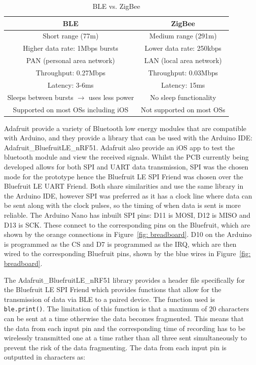 \begin{table}[t!]
\centering
\begin{tabular}{||c c||} 
 \hline
 BLE & ZigBee \\ [0.5ex] 
 \hline\hline
 Short range (77m) & Medium range (291m) \\
 Higher data rate: 1Mbps bursts & Lower data rate: 250kbps \\ 
 PAN (personal area network) & LAN (local area network) \\
 Throughput: 0.27Mbps & Throughput: 0.03Mbps \\
 Latency: 3-6ms & Latency: 15ms \\
 Sleeps between bursts $\rightarrow$ uses less power & No sleep functionality \\
 Supported on most OSs including iOS & Not supported on most OSs \\
 \hline
\end{tabular}
\caption{BLE vs. ZigBee \cite{Ray2015, Christiano}}
\label{table:BLE vs ZigBee}
\end{table}

Adafruit provide a variety of Bluetooth low energy modules that are compatible with Arduino, and they provide a library that can be used with the Arduino IDE: Adafruit\_BluefruitLE\_nRF51. Adafruit also provide an iOS app to test the bluetooth module and view the received signals. Whilst the PCB currently being developed allows for both SPI and UART data transmission, SPI was the chosen mode for the prototype hence the Bluefruit LE SPI Friend was chosen over the Bluefruit LE UART Friend. Both share similarities and use the same library in the Arduino IDE, however SPI was preferred as it has a clock line where data can be sent along with the clock pulses, so the timing of when data is sent is more reliable. The Arduino Nano has inbuilt SPI pins: D11 is MOSI, D12 is MISO and D13 is SCK. These connect to the corresponding pins on the Bluefruit, which are shown by the orange connections in Figure~\ref{fig: breadboard}. D10 on the Arduino is programmed as the CS and D7 is programmed as the IRQ, which are then wired to the corresponding Bluefruit pins, shown by the blue wires in Figure~\ref{fig: breadboard}. 

The Adafruit\_BluefruitLE\_nRF51 library provides a header file specifically for the Bluefruit LE SPI Friend which provides functions that allow for the transmission of data via BLE to a paired device. The function used is {\tt{ble.print()}}. The limitation of this function is that a maximum of 20 characters can be sent at a time otherwise the data becomes fragmented. This means that the data from each input pin and the corresponding time of recording has to be wirelessly transmitted one at a time rather than all three sent simultaneously to prevent the risk of the data fragmenting. The data from each input pin is outputted in characters as:

